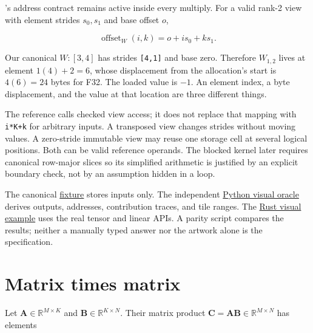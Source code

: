 's address contract remains active inside every multiply. For a
valid rank-2 view with element strides \(s_0,s_1\) and base offset
\(o\),

\begin{equation}
\operatorname{offset}_W(i,k)=o+i s_0+k s_1.
\end{equation}

Our canonical \(W:[3,4]\) has strides \texttt{{[}4,1{]}} and base zero.
Therefore \(W_{1,2}\) lives at element \(1(4)+2=6\), whose displacement
from the allocation's start is \(4(6)=24\) bytes for F32. The loaded
value is \(-1\). An element index, a byte displacement, and the value at
that location are three different things.


The reference calls checked view access; it does not replace that
mapping with \texttt{i*K+k} for arbitrary inputs. A transposed view
changes strides without moving values. A zero-stride immutable view may
reuse one storage cell at several logical positions. Both can be valid
reference operands. The blocked kernel later requires canonical
row-major slices so its simplified arithmetic is justified by an
explicit boundary check, not by an assumption hidden in a loop.

The canonical
\href{https://github.com/hermonai/inside-the-llm-engine/blob/astra-visual-rewrite/code/reference/fixtures/chapter06-visual.json}{fixture}
stores inputs only. The independent
\href{https://github.com/hermonai/inside-the-llm-engine/blob/astra-visual-rewrite/code/reference/python/chapter06_visual_oracle.py}{Python
visual oracle} derives outputs, addresses, contribution traces, and tile
ranges. The
\href{https://github.com/hermonai/inside-the-llm-engine/blob/astra-visual-rewrite/code/mini-engine/crates/engine0/examples/chapter06_visual_trace.rs}{Rust
visual example} uses the real tensor and linear APIs. A parity script
compares the results; neither a manually typed answer nor the artwork
alone is the specification.

\section{Matrix times matrix}\label{matrix-times-matrix}

Let \(\mathbf{A}\in\mathbb{R}^{M\times K}\) and
\(\mathbf{B}\in\mathbb{R}^{K\times N}\). Their matrix product
\(\mathbf{C}=\mathbf{A}\mathbf{B}\in\mathbb{R}^{M\times N}\) has
elements

